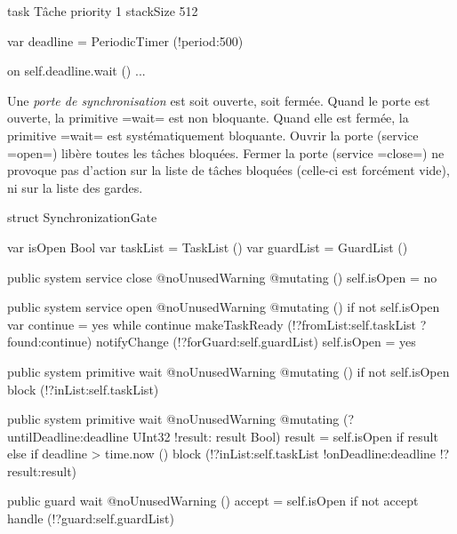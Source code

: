 \begin{OMNIBUS}
task Tâche priority 1 stackSize 512 {
  var deadline = PeriodicTimer (!period:500)


  on self.deadline.wait () {
    ...
  }
}
\end{OMNIBUS}






Une \emph{porte de synchronisation} est soit ouverte, soit fermée. Quand le porte est ouverte, la primitive \omnibus=wait= est non bloquante. Quand elle est fermée, la primitive \omnibus=wait= est systématiquement bloquante. Ouvrir la porte (service \omnibus=open=) libère toutes les tâches bloquées. Fermer la porte (service \omnibus=close=) ne provoque pas d'action sur la liste de tâches bloquées (celle-ci est forcément vide), ni sur la liste des gardes.

\begin{OMNIBUS}
struct SynchronizationGate {
  var isOpen Bool
  var taskList = TaskList ()
  var guardList = GuardList ()

  public system service close @noUnusedWarning @mutating () {
    self.isOpen = no
  }

  public system service open @noUnusedWarning @mutating () {
    if not self.isOpen {
      var continue = yes
      while continue {
        makeTaskReady (!?fromList:self.taskList ?found:continue)
      }
      notifyChange (!?forGuard:self.guardList)
      self.isOpen = yes
    }
  }

  public system primitive wait @noUnusedWarning @mutating () {
    if not self.isOpen {
      block (!?inList:self.taskList)
    }
  }

  public system primitive wait
  @noUnusedWarning @mutating (?untilDeadline:deadline UInt32
                              !result: result Bool) {
    result = self.isOpen
    if result {
    }else if deadline > time.now () {
      block (!?inList:self.taskList !onDeadline:deadline !?result:result)
    }
  }

  public guard wait @noUnusedWarning () {
    accept = self.isOpen
    if not accept {
      handle (!?guard:self.guardList)
    }
  }
}
\end{OMNIBUS}






